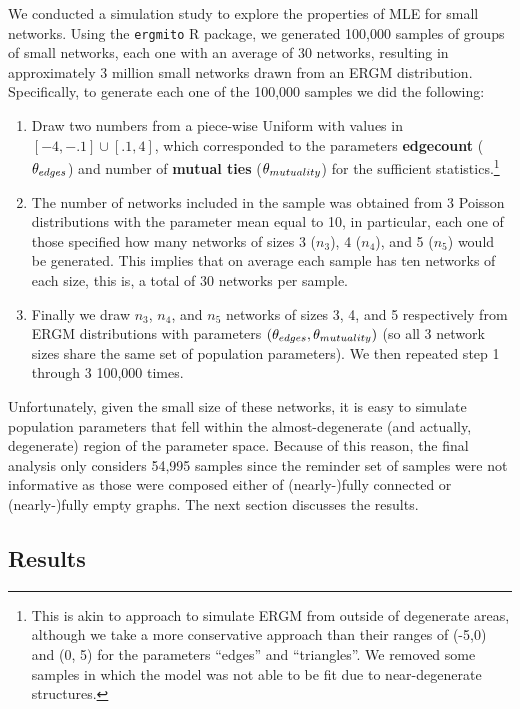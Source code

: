 \documentclass[12pt]{article}
\begin{document}
We conducted a simulation study to explore the properties of MLE for small networks. Using the \texttt{ergmito} R package, we generated 100,000 samples of groups of small networks, each one with an average of 30 networks, resulting in approximately 3 million small networks drawn from an ERGM distribution. Specifically, to generate each one of the 100,000 samples we did the following:

\begin{enumerate}

\item Draw two numbers from a piece-wise Uniform with values in $[-4, -.1]\cup[.1, 4]$, which corresponded to the parameters \textbf{edgecount} ($\theta_{edges}$) and number of \textbf{mutual ties} ($\theta_{mutuality}$) for the sufficient statistics.\footnote{This is akin to \cite{Schweinberger2015} approach to simulate ERGM from outside of degenerate areas, although we take a more conservative approach than their ranges of (-5,0) and (0, 5) for the parameters ``edges'' and ``triangles''. We removed some samples in which the model was not able to be fit due to near-degenerate structures.}

\item The number of networks included in the sample was obtained from 3 Poisson distributions with the parameter mean equal to 10, in particular, each one of those specified how many networks of sizes 3 ($n_3$), 4 ($n_4$), and 5 ($n_5$) would be generated. This implies that on average each sample has ten networks of each size, this is, a total of 30 networks per sample.

\item Finally we draw $n_3$, $n_4$, and $n_5$ networks of sizes 3, 4, and 5 respectively from ERGM distributions with parameters $(\theta_{edges}, \theta_{mutuality})$ (so all 3 network sizes share the same set of population parameters). We then repeated step 1 through 3 100,000 times.
\end{enumerate}

Unfortunately, given the small size of these networks, it is easy to simulate population parameters that fell within the almost-degenerate (and actually, degenerate) region of the parameter space. Because of this reason, the final analysis only considers 54,995 samples since the reminder set of samples were not informative as those were composed either of (nearly-)fully connected or (nearly-)fully empty graphs. The next section discusses the results.

\subsection{Results}
\end{document}
